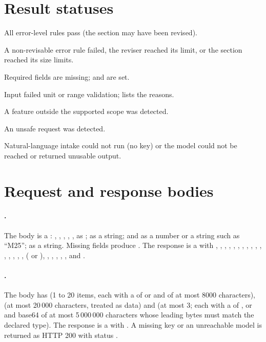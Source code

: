 \section{Result statuses}
\begin{description}[leftmargin=3.2cm,style=nextline]
  \item[\code{designed}] All error-level rules pass (the section may have been revised).
  \item[\code{needs_engineer}] A non-revisable error rule failed, the reviser reached its limit, or the section reached its size limits.
  \item[\code{needs_info}] Required fields are missing;  and  are set.
  \item[\code{rejected}] Input failed unit or range validation;  lists the reasons.
  \item[\code{out_of_scope}] A feature outside the supported scope was detected.
  \item[\code{refused}] An unsafe request was detected.
  \item[\code{error}] Natural-language intake could not run (no key) or the model could not be reached or returned unusable output.
\end{description}

\section{Request and response bodies}
\paragraph{.} The body is a : , , , , ,  as ;  as a string;  and  as a number or a string such as ``M25'';  as a string. Missing fields produce . The response is a  with , , , , , , , , , , , , , , , ,  ( or ), , , , , ,  and .
\paragraph{.} The body has  (1 to 20 items, each with a  of  or  and  of at most 8000 characters),  (at most 20\,000 characters, treated as data) and  (at most 3; each with a  of ,  or  and base64  of at most 5\,000\,000 characters whose leading bytes must match the declared type). The response is a  with  . A missing key or an unreachable model is returned as HTTP 200 with status .
